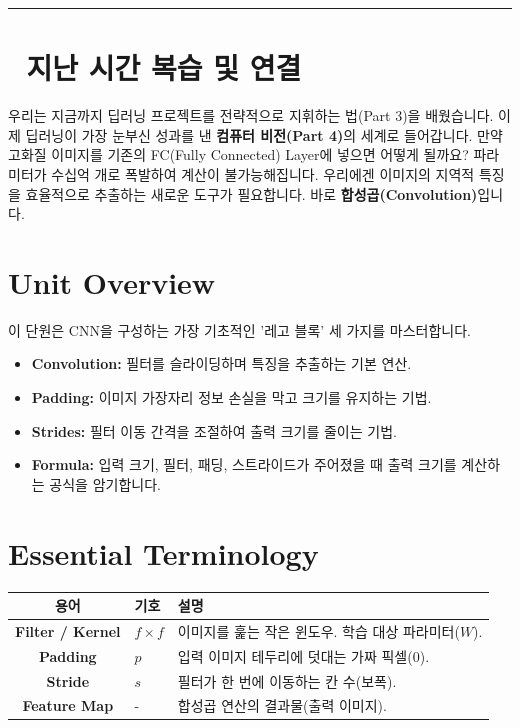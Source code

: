 \documentclass[11pt,a4paper]{book}
\theoremstyle{definition}
\begin{document}
\vspace{0.5cm}
\hrule
\vspace{0.5cm}

\section*{🔗 지난 시간 복습 및 연결}
우리는 지금까지 딥러닝 프로젝트를 전략적으로 지휘하는 법(Part 3)을 배웠습니다. 이제 딥러닝이 가장 눈부신 성과를 낸 \textbf{컴퓨터 비전(Part 4)}의 세계로 들어갑니다.
만약 고화질 이미지를 기존의 FC(Fully Connected) Layer에 넣으면 어떻게 될까요? 파라미터가 수십억 개로 폭발하여 계산이 불가능해집니다.
우리에겐 이미지의 지역적 특징을 효율적으로 추출하는 새로운 도구가 필요합니다. 바로 \textbf{합성곱(Convolution)}입니다.

\section{Unit Overview}
\begin{summarybox}[title={핵심 목표}]
이 단원은 CNN을 구성하는 가장 기초적인 '레고 블록' 세 가지를 마스터합니다.
\begin{itemize}
    \item \textbf{Convolution:} 필터를 슬라이딩하며 특징을 추출하는 기본 연산.
    \item \textbf{Padding:} 이미지 가장자리 정보 손실을 막고 크기를 유지하는 기법.
    \item \textbf{Strides:} 필터 이동 간격을 조절하여 출력 크기를 줄이는 기법.
    \item \textbf{Formula:} 입력 크기, 필터, 패딩, 스트라이드가 주어졌을 때 출력 크기를 계산하는 공식을 암기합니다.
\end{itemize}
\end{summarybox}

\section{Essential Terminology}
\begin{center}
\begin{tabular}{|c|l|l|}
\hline
\textbf{용어} & \textbf{기호} & \textbf{설명} \\ \hline
\textbf{Filter / Kernel} & $f \times f$ & 이미지를 훑는 작은 윈도우. 학습 대상 파라미터($W$). \\ \hline
\textbf{Padding} & $p$ & 입력 이미지 테두리에 덧대는 가짜 픽셀(0). \\ \hline
\textbf{Stride} & $s$ & 필터가 한 번에 이동하는 칸 수(보폭). \\ \hline
\textbf{Feature Map} & - & 합성곱 연산의 결과물(출력 이미지). \\ \hline
\end{tabular}
\end{center}
\end{document}
